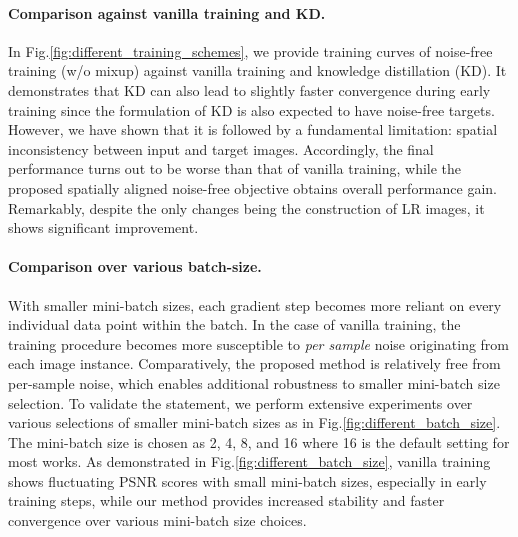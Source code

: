 \documentclass[letterpaper]{article} %
\begin{document}
\paragraph{Comparison against vanilla training and KD.}
In Fig.\ref{fig:different_training_schemes}, we provide training curves of noise-free training (w/o mixup) against vanilla training and knowledge distillation (KD). 
It demonstrates that KD can also lead to slightly faster convergence during early training since the formulation of KD is also expected to have noise-free targets. However, we have shown that it is followed by a fundamental limitation: spatial inconsistency between input and target images. Accordingly, the final performance turns out to be worse than that of vanilla training, while the proposed spatially aligned noise-free objective obtains overall performance gain. 
%
Remarkably, despite the only changes being the construction of LR images, it shows significant improvement.



\paragraph{Comparison over various batch-size.}
With smaller mini-batch sizes, each gradient step becomes more reliant on every individual data point within the batch. In the case of vanilla training, the training procedure becomes more susceptible to \textit{per sample} noise originating from each image instance. 
Comparatively, the proposed method is relatively free from per-sample noise, which enables additional robustness to smaller mini-batch size selection. To validate the statement, we perform extensive experiments over various selections of smaller mini-batch sizes as in Fig.\ref{fig:different_batch_size}. 
The mini-batch size is chosen as 2, 4, 8, and 16 where 16 is the default setting for most works. 
%
As demonstrated in Fig.\ref{fig:different_batch_size}, vanilla training shows fluctuating PSNR scores with small mini-batch sizes, especially in early training steps, while our method provides increased stability and faster convergence over various mini-batch size choices. 
\end{document}

